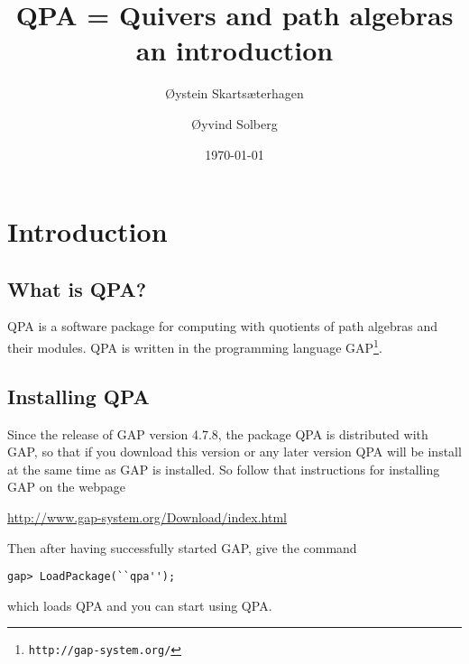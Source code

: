 \documentclass{amsart}
\theoremstyle{definition}
\theoremstyle{theoretic}
\begin{document}
\title[QPA -- an introduction]{QPA = Quivers and path algebras\\an introduction} 

\author[Skarts\ae terhagen]{\O ystein  Skarts\ae terhagen}
\address{\O ystein Skarts\ae terhagen\\
Institutt for matematiske fag\\
NTNU\\ 
N--7491 Trondheim\\ 
Norway}

\author[Solberg]{\O yvind Solberg}
\address{\O yvind Solberg\\
Institutt for matematiske fag\\
NTNU\\ 
N--7491 Trondheim\\ 
Norway}

\date{\today}

\begin{abstract}
\end{abstract}

\maketitle



\section{Introduction}

\subsection{What is QPA?\nopunct}

QPA is a software package for computing with quotients of path
algebras and their modules.  QPA is written in the programming
language GAP\footnote{\texttt{http://gap-system.org/}}.



\subsection{Installing QPA}
Since the release of GAP version 4.7.8, the package QPA is distributed
with GAP, so that if you download this version or any later version
QPA will be install at the same time as GAP is installed.  So follow
that instructions for installing GAP on the webpage
\begin{center}
\url{http://www.gap-system.org/Download/index.html}
\end{center}
Then after having successfully started GAP, give the command
\begin{verbatim}
gap> LoadPackage(``qpa'');
\end{verbatim}
which loads QPA and you can start using QPA. 
\end{document}

